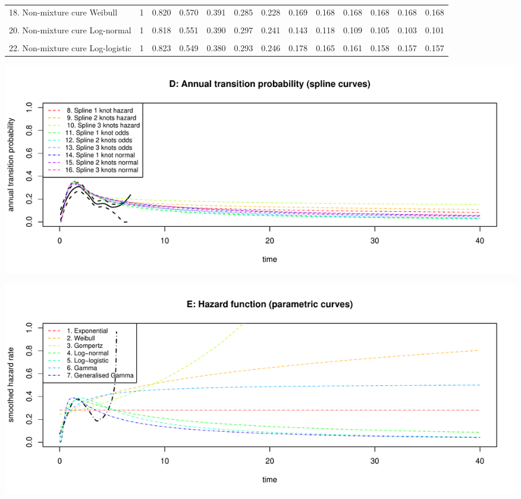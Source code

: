 \documentclass[]{article}
\begin{document}
\begin{table}
{\begin{tabular}[t]{lrrrrrrrrrrrr}
18. Non-mixture cure Weibull & 1 & 0.820 & 0.570 & 0.391 & 0.285 & 0.228 & 0.169 & 0.168 & 0.168 & 0.168 & 0.168 & 0.168\\
\cellcolor{gray!6}{19. Mixture cure Log-normal} & \cellcolor{gray!6}{1} & \cellcolor{gray!6}{0.818} & \cellcolor{gray!6}{0.558} & \cellcolor{gray!6}{0.394} & \cellcolor{gray!6}{0.295} & \cellcolor{gray!6}{0.235} & \cellcolor{gray!6}{0.134} & \cellcolor{gray!6}{0.116} & \cellcolor{gray!6}{0.111} & \cellcolor{gray!6}{0.109} & \cellcolor{gray!6}{0.108} & \cellcolor{gray!6}{0.108}\\
20. Non-mixture cure Log-normal & 1 & 0.818 & 0.551 & 0.390 & 0.297 & 0.241 & 0.143 & 0.118 & 0.109 & 0.105 & 0.103 & 0.101\\
\cellcolor{gray!6}{21. Mixture cure Log-logistic} & \cellcolor{gray!6}{1} & \cellcolor{gray!6}{0.822} & \cellcolor{gray!6}{0.549} & \cellcolor{gray!6}{0.381} & \cellcolor{gray!6}{0.290} & \cellcolor{gray!6}{0.240} & \cellcolor{gray!6}{0.163} & \cellcolor{gray!6}{0.148} & \cellcolor{gray!6}{0.143} & \cellcolor{gray!6}{0.140} & \cellcolor{gray!6}{0.139} & \cellcolor{gray!6}{0.138}\\
22. Non-mixture cure Log-logistic & 1 & 0.823 & 0.549 & 0.380 & 0.293 & 0.246 & 0.178 & 0.165 & 0.161 & 0.158 & 0.157 & 0.157\\
\bottomrule
\end{tabular}}
\end{table}

\begin{flushleft}\includegraphics[height=0.29\textheight]{Images/validate_extrapolation3-4} \end{flushleft}

\begin{flushleft}\includegraphics[height=0.29\textheight]{Images/validate_extrapolation3-5} \end{flushleft}
\end{document}
